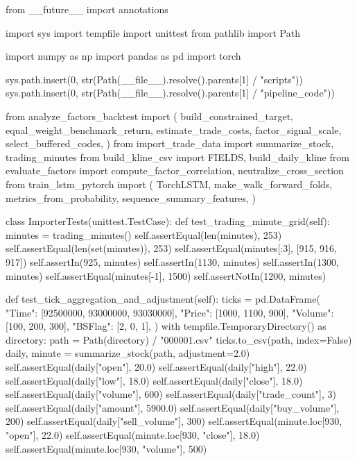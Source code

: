 \documentclass[UTF8,a4paper,fontset=fandol]{ctexart}
\begin{document}
\begin{ProjectCode}
from __future__ import annotations

import sys
import tempfile
import unittest
from pathlib import Path

import numpy as np
import pandas as pd
import torch

sys.path.insert(0, str(Path(__file__).resolve().parents[1] / "scripts"))
sys.path.insert(0, str(Path(__file__).resolve().parents[1] / "pipeline_code"))

from analyze_factors_backtest import (
    build_constrained_target,
    equal_weight_benchmark_return,
    estimate_trade_costs,
    factor_signal_scale,
    select_buffered_codes,
)
from import_trade_data import summarize_stock, trading_minutes
from build_kline_csv import FIELDS, build_daily_kline
from evaluate_factors import compute_factor_correlation, neutralize_cross_section
from train_lstm_pytorch import (
    TorchLSTM,
    make_walk_forward_folds,
    metrics_from_probability,
    sequence_summary_features,
)


class ImporterTests(unittest.TestCase):
    def test_trading_minute_grid(self):
        minutes = trading_minutes()
        self.assertEqual(len(minutes), 253)
        self.assertEqual(len(set(minutes)), 253)
        self.assertEqual(minutes[:3], [915, 916, 917])
        self.assertIn(925, minutes)
        self.assertIn(1130, minutes)
        self.assertIn(1300, minutes)
        self.assertEqual(minutes[-1], 1500)
        self.assertNotIn(1200, minutes)

    def test_tick_aggregation_and_adjustment(self):
        ticks = pd.DataFrame({
            "Time": [92500000, 93000000, 93030000],
            "Price": [1000, 1100, 900],
            "Volume": [100, 200, 300],
            "BSFlag": [2, 0, 1],
        })
        with tempfile.TemporaryDirectory() as directory:
            path = Path(directory) / "000001.csv"
            ticks.to_csv(path, index=False)
            daily, minute = summarize_stock(path, adjustment=2.0)
        self.assertEqual(daily["open"], 20.0)
        self.assertEqual(daily["high"], 22.0)
        self.assertEqual(daily["low"], 18.0)
        self.assertEqual(daily["close"], 18.0)
        self.assertEqual(daily["volume"], 600)
        self.assertEqual(daily["trade_count"], 3)
        self.assertEqual(daily["amount"], 5900.0)
        self.assertEqual(daily["buy_volume"], 200)
        self.assertEqual(daily["sell_volume"], 300)
        self.assertEqual(minute.loc[930, "open"], 22.0)
        self.assertEqual(minute.loc[930, "close"], 18.0)
        self.assertEqual(minute.loc[930, "volume"], 500)


\end{ProjectCode}
\end{document}
